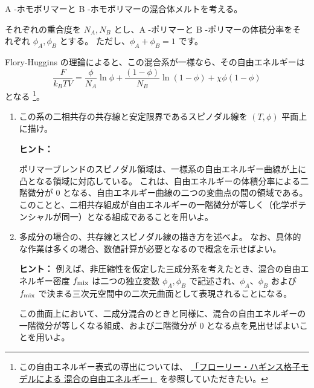 \documentclass[uplatex,dvipdfmx,a4paper,11pt]{jsarticle}
\begin{document}
\vspace{10pt}

A -ホモポリマーと B -ホモポリマーの混合体メルトを考える。

それぞれの重合度を $N_A, N_B$ とし、A -ポリマーと B -ポリマーの体積分率をそれぞれ $\phi_A, \phi_B$ とする。
ただし、$\phi_A + \phi_B = 1$ です。

Flory-Huggins の理論によると、この混合系が一様なら、その自由エネルギーは
\begin{equation*}
\dfrac{F}{k_B T V} = \dfrac{\phi}{N_A} \ln \phi + \dfrac{(1-\phi)}{N_B} \ln (1-\phi) + \chi \phi (1-\phi)
\end{equation*}
となる
\footnote
{
この自由エネルギー表式の導出については、
\href{https://dl.dropboxusercontent.com/u/18899343/physics/FH_model/FH_model.pdf}{「フローリー・ハギンス格子モデルによる
混合の自由エネルギー」}
を参照していただきたい。
}。


\begin{enumerate}
\setlength{\parskip}{0cm} %
\setlength{\itemsep}{0.5cm} %

\item
この系の二相共存の共存線と安定限界であるスピノダル線を $(T, \phi)$ 平面上に描け。

\begin{itembox}[l]{{\bf ヒント：}}

ポリマーブレンドのスピノダル領域は、一様系の自由エネルギー曲線が上に凸となる領域に対応している。
これは、自由エネルギーの体積分率による二階微分が 0 となる、自由エネルギー曲線の二つの変曲点の間の領域である。
このことと、二相共存組成が自由エネルギーの一階微分が等しく（化学ポテンシャルが同一）となる組成であることを用いよ。
\end{itembox}


\item
多成分の場合の、共存線とスピノダル線の描き方を述べよ。
なお、具体的な作業は多くの場合、数値計算が必要となるので概念を示せばよい。

\begin{itembox}[l]{{\bf ヒント：}}
例えば、非圧縮性を仮定した三成分系を考えたとき、混合の自由エネルギー密度 $f_{\rm{mix}}$ は二つの独立変数 $\phi_A, \phi_B$ で記述され、$\phi_A$、$\phi_B$ および $f_{\rm{mix}}$ で決まる三次元空間中の二次元曲面として表現されることになる。

\color{red}
この曲面上において、二成分混合のときと同様に、混合の自由エネルギーの一階微分が等しくなる組成、および二階微分が 0 となる点を見出せばよいことを用いよ。
\color{black}
\end{itembox}

\end{enumerate}
\end{document}
